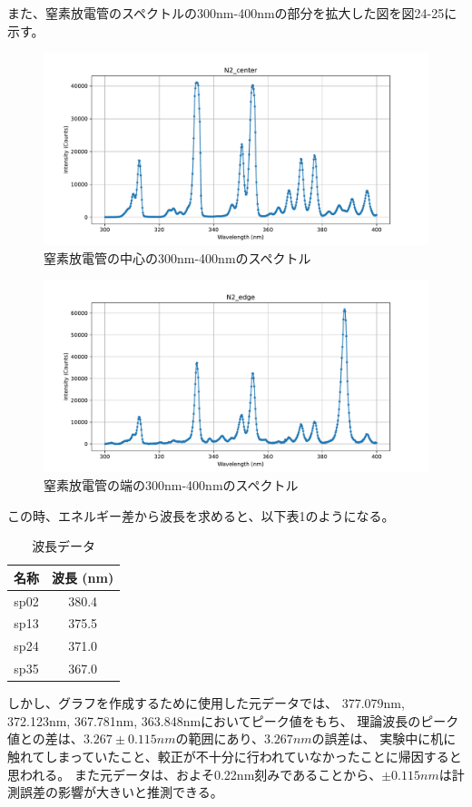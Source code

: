 \documentclass[a4j,twocolumn]{jsarticle}
\begin{document}
また、窒素放電管のスペクトルの300nm-400nmの部分を拡大した図を図24-25に示す。

\begin{figure}[htb]
    \centering
    \includegraphics[keepaspectratio,width=0.6\columnwidth]{fig/N2_300-400center.pdf}
    \caption{窒素放電管の中心の300nm-400nmのスペクトル}
\end{figure}
\begin{figure}[htb]
    \centering
    \includegraphics[keepaspectratio,width=0.6\columnwidth]{fig/N2_300-400edge.pdf}
    \caption{窒素放電管の端の300nm-400nmのスペクトル}
\end{figure}

この時、エネルギー差から波長を求めると、以下表1のようになる。
\begin{table}[htb]
    \centering
    \begin{tabular}{|c|c|}
        \hline
        \textbf{名称} & \textbf{波長 (nm)} \\
        \hline
        sp02 & 380.4 \\
        \hline
        sp13 & 375.5 \\
        \hline
        sp24 & 371.0 \\
        \hline
        sp35 & 367.0 \\
        \hline
    \end{tabular}
    \caption{波長データ}
    \label{tab:wavelengths}
\end{table}

しかし、グラフを作成するために使用した元データでは、
377.079nm, 372.123nm, 367.781nm, 363.848nmにおいてピーク値をもち、
理論波長のピーク値との差は、$3.267\pm0.115nm$の範囲にあり、$3.267nm$の誤差は、
実験中に机に触れてしまっていたこと、較正が不十分に行われていなかったことに帰因すると思われる。
また元データは、およそ0.22nm刻みであることから、$\pm0.115nm$は計測誤差の影響が大きいと推測できる。
\end{document}

